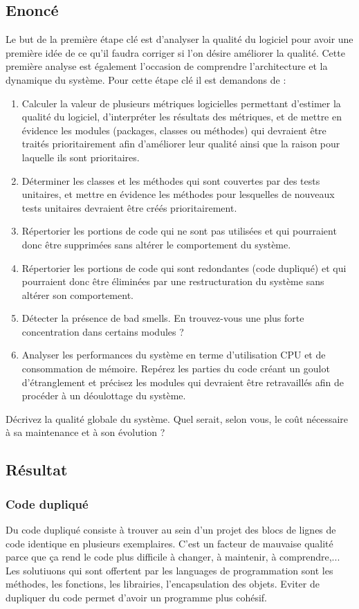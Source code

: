 \documentclass[12pt,a4paper,final]{article}
\begin{document}
\subsection{Enoncé}
Le but de la première étape clé est d'analyser la qualité du logiciel pour avoir une première idée de ce qu'il faudra corriger si l'on désire améliorer la qualité. Cette première analyse est également l'occasion de comprendre l'architecture et la dynamique du système.
Pour cette étape clé il est demandons de :
\begin{enumerate}
\item Calculer la valeur de plusieurs métriques logicielles permettant d'estimer la qualité du logiciel, d'interpréter les résultats des métriques, et de mettre en évidence les modules (packages, classes ou méthodes) qui devraient être traités prioritairement afin d'améliorer leur qualité ainsi que la raison pour laquelle ils sont prioritaires.
\item Déterminer les classes et les méthodes qui sont couvertes par des tests unitaires, et mettre en évidence les méthodes pour lesquelles de nouveaux tests unitaires devraient être créés prioritairement.
\item Répertorier les portions de code qui ne sont pas utilisées et qui pourraient donc être supprimées sans altérer le comportement du système.
\item Répertorier les portions de code qui sont redondantes (code dupliqué) et qui pourraient donc être éliminées par une restructuration du système sans altérer son comportement.
\item Détecter la présence de bad smells. En trouvez-vous une plus forte concentration dans certains modules ?
\item Analyser les performances du système en terme d'utilisation CPU et de consommation de mémoire. Repérez les parties du code créant un goulot d'étranglement et précisez les modules qui devraient être retravaillés afin de procéder à un déoulottage du système.
\end{enumerate}
Décrivez la qualité globale du système. Quel serait, selon vous, le coût nécessaire à sa maintenance et à son évolution ?
\subsection{Résultat}

\subsubsection{Code dupliqué}\label{codeduplique}
Du code dupliqué consiste à trouver au sein d'un projet des blocs de lignes de code identique en plusieurs exemplaires.
C'est un facteur de mauvaise qualité parce que ça rend le code plus difficile à changer, à maintenir, à comprendre,...
Les solutiuons qui sont offertent par les languages de programmation sont les méthodes, les fonctions, les librairies, l'encapsulation des objets.
Eviter de dupliquer du code permet d'avoir un programme plus cohésif.
\end{document}
